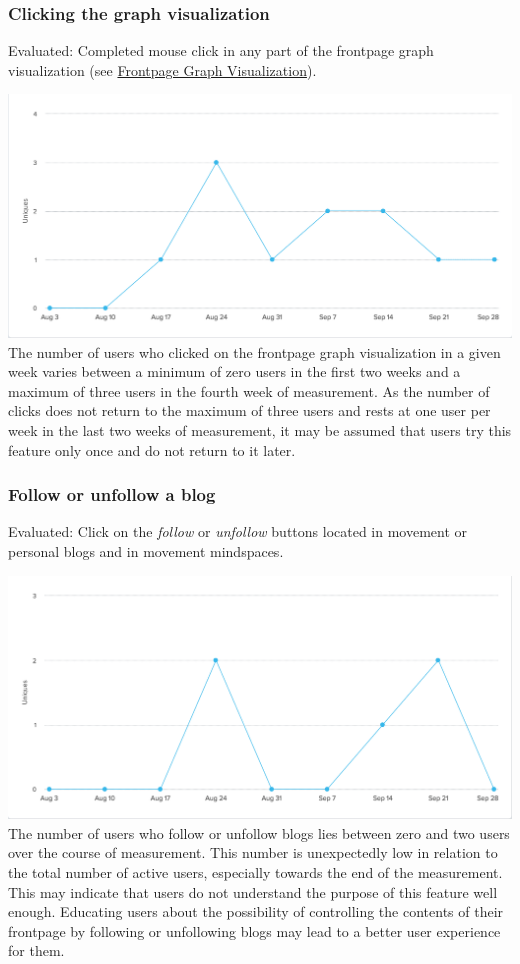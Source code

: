 \subsubsection{Clicking the graph
visualization}\label{clicking-the-graph-visualization}

Evaluated: Completed mouse click in any part of the frontpage graph
visualization (see \href{img/graph.png}{Frontpage Graph Visualization}).

\includegraphics{img/eval_click_graph.png}\\
 The number of users who clicked on the frontpage graph visualization in
a given week varies between a minimum of zero users in the first two
weeks and a maximum of three users in the fourth week of measurement. As
the number of clicks does not return to the maximum of three users and
rests at one user per week in the last two weeks of measurement, it may
be assumed that users try this feature only once and do not return to it
later.

\subsubsection{Follow or unfollow a
blog}\label{follow-or-unfollow-a-blog}

Evaluated: Click on the \emph{follow} or \emph{unfollow} buttons located
in movement or personal blogs and in movement mindspaces.

\includegraphics{img/eval_follow.png}\\
 The number of users who follow or unfollow blogs lies between zero and
two users over the course of measurement. This number is unexpectedly
low in relation to the total number of active users, especially towards
the end of the measurement. This may indicate that users do not
understand the purpose of this feature well enough. Educating users
about the possibility of controlling the contents of their frontpage by
following or unfollowing blogs may lead to a better user experience for
them.

